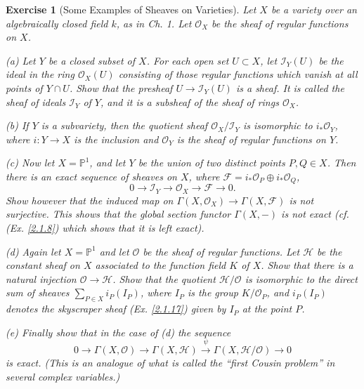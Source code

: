 \documentclass[12pt]{amsart}
\newtheorem{exe}{Exercise}[subsection]
\begin{document}
\begin{exe}[Some Examples of Sheaves on Varieties]
	\label{2.1.21}
	Let $X$ be a variety over an algebraically closed field $k$, as in \textup{Ch. 1}. Let $\mathcal{O}_X$ be the sheaf of regular functions on $X$.
	
	(a) Let $Y$ be a closed subset of $X$. For each open set $U\subset X$, let $\mathscr{I}_Y(U)$ be the ideal in the ring $\mathcal{O}_X(U)$ consisting of those regular functions which vanish at all points of $Y\cap U$. Show that the presheaf $U\to\mathscr{I}_Y(U)$ is a sheaf. It is called the \textup{sheaf of ideals} $\mathscr{I}_Y$ of $Y$, and it is a subsheaf of the sheaf of rings $\mathcal{O}_X$.
	
	(b) If $Y$ is a subvariety, then the quotient sheaf $\mathcal{O}_X/\mathscr{I}_Y$ is isomorphic to $i_*\mathcal{O}_Y$, where $i:Y\to X$ is the inclusion and $\mathcal{O}_Y$ is the sheaf of regular functions on $Y$.
	
	(c) Now let $X=\mathbb{P}^1$, and let $Y$ be the union of two distinct points $P,Q\in X$. Then there is an exact sequence of sheaves on $X$, where $\mathscr{F}=i_*\mathcal{O}_P\oplus i_*\mathcal{O}_Q$,$$0\to\mathscr{I}_Y\to\mathcal{O}_X\to\mathscr{F}\to0.$$Show however that the induced map on $\Gamma(X,\mathcal{O}_X)\to\Gamma(X,\mathscr{F})$ is not surjective. This shows that the global section functor $\Gamma(X,-)$ is not exact \textup{(cf. (Ex. \ref{2.1.8}) which shows that it is left exact)}.
	
	(d) Again let $X=\mathbb{P}^1$ and let $\mathcal{O}$ be the sheaf of regular functions. Let $\mathscr{H}$ be the constant sheaf on $X$ associated to the function field $K$ of $X$. Show that there is a natural injection $\mathcal{O}\to\mathscr{H}$. Show that the quotient $\mathscr{H}/\mathcal{O}$ is isomorphic to the direct sum of sheaves $\sum_{P\in X}i_P(I_P)$, where $I_P$ is the group $K/\mathcal{O}_P$, and $i_P(I_P)$ denotes the skyscraper sheaf \textup{(Ex. \ref{2.1.17})} given by $I_P$ at the point $P$.
	
	(e) Finally show that in the case of (d) the sequence$$0\to\Gamma(X,\mathcal{O})\to\Gamma(X,\mathscr{H})\xrightarrow{\psi}\Gamma(X,\mathscr{H}/\mathcal{O})\to0$$is exact. \textup{(This is an analogue of what is called the ``first Cousin problem'' in several complex variables.)}
\end{exe}
\end{document}
